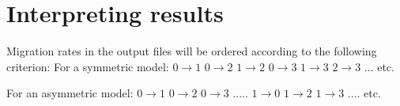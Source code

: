 \documentclass[10pt,letterpaper]{article}
\begin{document}
\section{Interpreting results}

Migration rates in the output files will be ordered according to the following criterion:
For a symmetric model:  \hspace{0.3cm} $0\rightarrow 1$ \hspace{0.3cm}  $0\rightarrow 2$  \hspace{0.3cm}  $1\rightarrow 2$ \hspace{0.3cm}   $0\rightarrow 3$  \hspace{0.3cm}  $1\rightarrow 3$ \hspace{0.3cm}   $2\rightarrow 3$ ...  etc.

For an asymmetric model:  \hspace{0.3cm} $0\rightarrow 1$  \hspace{0.3cm}  $0\rightarrow 2$ \hspace{0.3cm}   $0\rightarrow 3$  ..... \hspace{0.3cm}  $1\rightarrow 0$  \hspace{0.3cm}  $1\rightarrow 2$ \hspace{0.3cm}  $1\rightarrow 3$   ....  etc.
\end{document}
